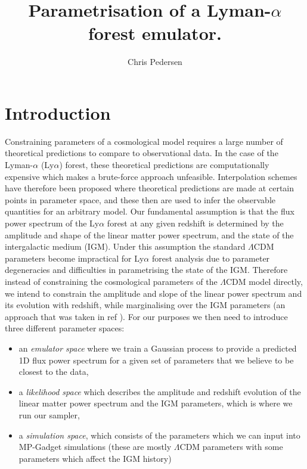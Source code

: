 \documentclass[]{article}
\title{Parametrisation of a Lyman-$\alpha$ forest emulator.}
\author[a]{Chris Pedersen}
\affiliation[a]{Department of Physics and Astronomy, University College London, Gower Street, London, United Kingdom}
\newcommand{\lyaf}{Ly$\alpha$ forest }                     %
\newcommand{\lya}{Ly$\alpha$}
\begin{document}
\maketitle

\section{Introduction}
Constraining parameters of a cosmological model requires a large number of theoretical 
predictions to compare to observational data. In the case of the Lyman-$\alpha$ (\lya) 
forest, these theoretical predictions are computationally expensive which makes a 
brute-force approach unfeasible. Interpolation schemes have therefore been proposed where 
theoretical predictions are made at certain points in parameter space, and these then are 
used to infer the observable quantities for an arbitrary model.
Our fundamental assumption is that the flux power spectrum of the \lyaf at any given 
redshift is determined by the amplitude and shape of the linear matter power spectrum, 
and the state of the intergalactic medium (IGM). Under this assumption the standard 
$\Lambda$CDM parameters become impractical for \lyaf analysis due to parameter 
degeneracies and difficulties in parametrising the state of the IGM. Therefore instead of 
constraining the cosmological parameters of the $\Lambda$CDM model directly, we intend to 
constrain the amplitude and slope of the linear power spectrum and its evolution with 
redshift, while marginalising over the IGM parameters (an approach that was taken in ref 
\cite{McDonald2005}). For our purposes we then need to introduce three different 
parameter spaces:


\begin{itemize}
    \item an \textit{emulator space} where we train a Gaussian process to provide a 
    predicted 1D flux power spectrum for a given set of parameters that we believe to be 
    closest to the data,
    \item a \textit{likelihood space} which describes the amplitude and redshift 
    evolution of the linear matter power spectrum and the IGM parameters, which is where 
    we run our sampler,
    \item a \textit{simulation space}, which consists of the parameters which we can 
    input into MP-Gadget simulations (these are mostly $\Lambda$CDM parameters with some 
    parameters which affect the IGM history)
\end{itemize}
\end{document}
